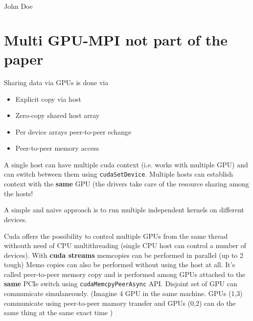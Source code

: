 \documentclass[conference]{IEEEtran}
\begin{document}
% 

\begin{IEEEbiography}{John Doe}
\blindtext
\end{IEEEbiography}





\section{Multi GPU-MPI not part of the paper}
Sharing data via GPUs is done via
\begin{itemize}
	\item Explicit copy via host
	\item Zero-copy shared host array
	\item Per device arrays peer-to-peer echange
	\item Peer-to-peer memory access
\end{itemize}
A single host can have multiple cuda context (i.e. works with multiple GPU) and can switch between them using \texttt{cudaSetDevice}.
Multiple hosts can establish context with the \textbf{same} GPU (the drivers take care of the resource sharing among the hosts!

A simple and naive approach is to run multiple independent kernels on different devices.

Cuda offers the possibility to control multiple GPUs from the same thread withouth need of CPU multithreading (single CPU host can control a number of devices).
With \textbf{cuda streams} memcopies can be performed in parallel (up to 2 tough)
Memo copies can also be performed without using the host at all. It's called peer-to-peer memory copy and is performed among GPUs attached to the \textbf{same} PCIe switch using \texttt{cudaMemcpyPeerAsync} API. 
Disjoint set of GPU can communicate simulaneously. (Imagine 4 GPU in the same machine. GPUs (1,3) communicate using peer-to-peer mamory transfer and GPUs (0,2) can do the same thing at the same exact time )
\end{document}
